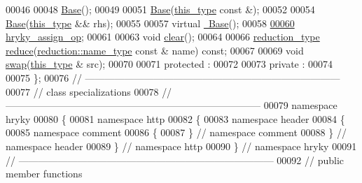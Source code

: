 \begin{DoxyCode}
00046 
00048     \hyperlink{classhryky_1_1http_1_1header_1_1comment_1_1_base_a5ffe0568374d8b9b4c4ec32953fd6453}{Base}();
00049 
00051     \hyperlink{classhryky_1_1http_1_1header_1_1comment_1_1_base_a5ffe0568374d8b9b4c4ec32953fd6453}{Base}(\hyperlink{classhryky_1_1http_1_1header_1_1comment_1_1_base}{this_type} \textcolor{keyword}{const} &);
00052 
00054     \hyperlink{classhryky_1_1http_1_1header_1_1comment_1_1_base_a5ffe0568374d8b9b4c4ec32953fd6453}{Base}(\hyperlink{classhryky_1_1http_1_1header_1_1comment_1_1_base}{this_type} && rhs);
00055 
00057     \textcolor{keyword}{virtual} \hyperlink{classhryky_1_1http_1_1header_1_1comment_1_1_base_a722da881b6c70cfcbde9243abcfbf334}{~Base}();
00058 
\hypertarget{http__header__comment__base_8h_source_l00060}{}\hyperlink{classhryky_1_1http_1_1header_1_1comment_1_1_base_addad64894098bb6bef0fea432ffe5e2f}{00060}     \hyperlink{classhryky_1_1http_1_1header_1_1comment_1_1_base_addad64894098bb6bef0fea432ffe5e2f}{hryky_assign_op};
00061 
00063     \textcolor{keywordtype}{void} \hyperlink{classhryky_1_1http_1_1header_1_1comment_1_1_base_a135bce05655e290c78fa83196199a576}{clear}();
00064 
00066     \hyperlink{classhryky_1_1_intrusive_ptr}{reduction_type} \hyperlink{classhryky_1_1http_1_1header_1_1comment_1_1_base_a2809ad5f75abd2266e6804e90094bc05}{reduce}(\hyperlink{classhryky_1_1reduction_1_1_string}{reduction::name_type} \textcolor{keyword}{const} & name) \textcolor{keyword}{const};
00067 
00069     \textcolor{keywordtype}{void} \hyperlink{classhryky_1_1http_1_1header_1_1comment_1_1_base_ab2b137d16fbe40d839ee136bd5304cab}{swap}(\hyperlink{classhryky_1_1http_1_1header_1_1comment_1_1_base}{this_type} & src);
00070 
00071 \textcolor{keyword}{protected} :
00072 
00073 \textcolor{keyword}{private} :
00074 
00075 \};
00076 \textcolor{comment}{//
      ------------------------------------------------------------------------------}
00077 \textcolor{comment}{// class specializations}
00078 \textcolor{comment}{//
      ------------------------------------------------------------------------------}
00079 \textcolor{keyword}{namespace }hryky
00080 \{
00081 \textcolor{keyword}{namespace }http
00082 \{
00083 \textcolor{keyword}{namespace }header
00084 \{
00085 \textcolor{keyword}{namespace }comment
00086 \{
00087 \} \textcolor{comment}{// namespace comment}
00088 \} \textcolor{comment}{// namespace header}
00089 \} \textcolor{comment}{// namespace http}
00090 \} \textcolor{comment}{// namespace hryky}
00091 \textcolor{comment}{//
      ------------------------------------------------------------------------------}
00092 \textcolor{comment}{// public member functions}

\end{DoxyCode}
